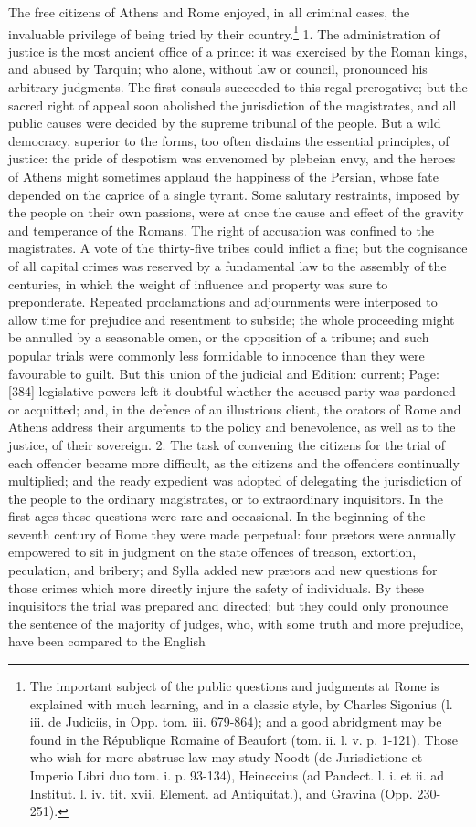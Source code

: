 The free citizens of Athens and Rome enjoyed, in all criminal cases, the invaluable privilege of being tried by their country.\footnote{The important subject of the public questions and judgments at Rome is explained with much learning, and in a classic style, by Charles Sigonius (l. iii. de Judiciis, in Opp. tom. iii. 679-864); and a good abridgment may be found in the République Romaine of Beaufort (tom. ii. l. v. p. 1-121). Those who wish for more abstruse law may study Noodt (de Jurisdictione et Imperio Libri duo tom. i. p. 93-134), Heineccius (ad Pandect. l. i. et ii. ad Institut. l. iv. tit. xvii. Element. ad Antiquitat.), and Gravina (Opp. 230-251).} 1. The administration of justice is the most ancient office of a prince: it was exercised by the Roman kings, and abused by Tarquin; who alone, without law or council, pronounced his arbitrary judgments. The first consuls succeeded to this regal prerogative; but the sacred right of appeal soon abolished the jurisdiction of the magistrates, and all public causes were decided by the supreme tribunal of the people. But a wild democracy, superior to the forms, too often disdains the essential principles, of justice: the pride of despotism was envenomed by plebeian envy, and the heroes of Athens might sometimes applaud the happiness of the Persian, whose fate depended on the caprice of a single tyrant. Some salutary restraints, imposed by the people on their own passions, were at once the cause and effect of the gravity and temperance of the Romans. The right of accusation was confined to the magistrates. A vote of the thirty-five tribes could inflict a fine; but the cognisance of all capital crimes was reserved by a fundamental law to the assembly of the centuries, in which the weight of influence and property was sure to preponderate. Repeated proclamations and adjournments were interposed to allow time for prejudice and resentment to subside; the whole proceeding might be annulled by a seasonable omen, or the opposition of a tribune; and such popular trials were commonly less formidable to innocence than they were favourable to guilt. But this union of the judicial and Edition: current; Page: [384] legislative powers left it doubtful whether the accused party was pardoned or acquitted; and, in the defence of an illustrious client, the orators of Rome and Athens address their arguments to the policy and benevolence, as well as to the justice, of their sovereign. 2. The task of convening the citizens for the trial of each offender became more difficult, as the citizens and the offenders continually multiplied; and the ready expedient was adopted of delegating the jurisdiction of the people to the ordinary magistrates, or to extraordinary inquisitors. In the first ages these questions were rare and occasional. In the beginning of the seventh century of Rome they were made perpetual: four prætors were annually empowered to sit in judgment on the state offences of treason, extortion, peculation, and bribery; and Sylla added new prætors and new questions for those crimes which more directly injure the safety of individuals. By these inquisitors the trial was prepared and directed; but they could only pronounce the sentence of the majority of judges, who, with some truth and more prejudice, have been compared to the English 